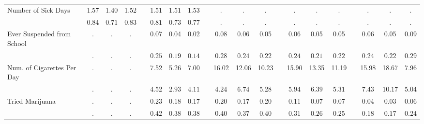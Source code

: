 \begin{center}
{\begin{longtable}{L{5cm} c c c p{.5cm} c c c p{.5cm} c c c p{.5cm} c c c p{.5cm} c c c}
 \quad Number of Sick Days & 1.57 &      1.40 &      1.52 & &      1.51 &      1.51 &      1.53 & &         . &         . &         . & &         . &         . &         . & &         . &         . &         . \\*
 \quad & $\mathit{     0.84}$ & $\mathit{     0.71}$ & $\mathit{     0.83}$ & & $\mathit{     0.81}$ & $\mathit{     0.73}$ & $\mathit{     0.77}$ & & $\mathit{        .}$ & $\mathit{        .}$ & $\mathit{        .}$ & & $\mathit{        .}$ & $\mathit{        .}$ & $\mathit{        .}$ & & $\mathit{        .}$ & $\mathit{        .}$ & $\mathit{        .}$ \\[.2em]
 \quad Ever Suspended from School & . &         . &         . & &      0.07 &      0.04 &      0.02 & &      0.08 &      0.06 &      0.05 & &      0.06 &      0.05 &      0.05 & &      0.06 &      0.05 &      0.09 \\*
 \quad & $\mathit{        .}$ & $\mathit{        .}$ & $\mathit{        .}$ & & $\mathit{     0.25}$ & $\mathit{     0.19}$ & $\mathit{     0.14}$ & & $\mathit{     0.28}$ & $\mathit{     0.24}$ & $\mathit{     0.22}$ & & $\mathit{     0.24}$ & $\mathit{     0.21}$ & $\mathit{     0.22}$ & & $\mathit{     0.24}$ & $\mathit{     0.22}$ & $\mathit{     0.29}$ \\[.2em]
 \quad Num. of Cigarettes Per Day & . &         . &         . & &      7.52 &      5.26 &      7.00 & &     16.02 &     12.06 &     10.23 & &     15.90 &     13.35 &     11.19 & &     15.98 &     18.67 &      7.96 \\*
 \quad & $\mathit{        .}$ & $\mathit{        .}$ & $\mathit{        .}$ & & $\mathit{     4.52}$ & $\mathit{     2.93}$ & $\mathit{     4.11}$ & & $\mathit{     4.24}$ & $\mathit{     6.74}$ & $\mathit{     5.28}$ & & $\mathit{     5.94}$ & $\mathit{     6.39}$ & $\mathit{     5.31}$ & & $\mathit{     7.43}$ & $\mathit{    10.17}$ & $\mathit{     5.04}$ \\[.2em]
 \quad Tried Marijuana & . &         . &         . & &      0.23 &      0.18 &      0.17 & &      0.20 &      0.17 &      0.20 & &      0.11 &      0.07 &      0.07 & &      0.04 &      0.03 &      0.06 \\*
 \quad & $\mathit{        .}$ & $\mathit{        .}$ & $\mathit{        .}$ & & $\mathit{     0.42}$ & $\mathit{     0.38}$ & $\mathit{     0.38}$ & & $\mathit{     0.40}$ & $\mathit{     0.37}$ & $\mathit{     0.40}$ & & $\mathit{     0.31}$ & $\mathit{     0.26}$ & $\mathit{     0.25}$ & & $\mathit{     0.18}$ & $\mathit{     0.17}$ & $\mathit{     0.24}$ \\[.2em]

\end{longtable}}
\end{center}
